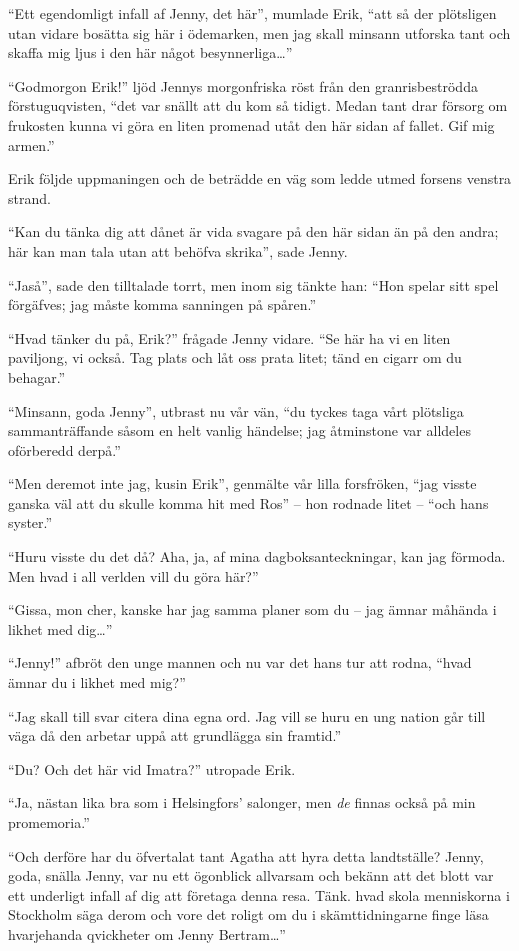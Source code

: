 ``Ett egendomligt infall af Jenny, det här'', mumlade Erik, ``att så der
plötsligen utan vidare bosätta sig här i ödemarken, men jag skall
minsann utforska tant och skaffa mig ljus i den här något
besynnerliga\ldots{}''

``Godmorgon Erik!'' ljöd Jennys morgonfriska röst från den
granrisbeströdda förstuguqvisten, ``det var snällt att du kom så tidigt.
Medan tant drar försorg om frukosten kunna vi göra en liten promenad
utåt den här sidan af fallet. Gif mig armen.''

Erik följde uppmaningen och de beträdde en väg som ledde utmed forsens
venstra strand.

``Kan du tänka dig att dånet är vida svagare på den här sidan än på den
andra; här kan man tala utan att behöfva skrika'', sade Jenny.

``Jaså'', sade den tilltalade torrt, men inom sig tänkte han: ``Hon
spelar sitt spel förgäfves; jag måste komma sanningen på spåren.''

``Hvad tänker du på, Erik?'' frågade Jenny vidare. ``Se här ha vi en
liten paviljong, vi också. Tag plats och låt oss prata litet; tänd en
cigarr om du behagar.''

``Minsann, goda Jenny'', utbrast nu vår vän, ``du tyckes taga vårt
plötsliga sammanträffande såsom en helt vanlig händelse; jag åtminstone
var alldeles oförberedd derpå.''

``Men deremot inte jag, kusin Erik'', genmälte vår lilla forsfröken,
``jag visste ganska väl att du skulle komma hit med Ros'' -- hon rodnade
litet -- ``och hans syster.''

``Huru visste du det då? Aha, ja, af mina dagboksanteckningar, kan jag
förmoda. Men hvad i all verlden vill du göra här?''

``Gissa, mon cher, kanske har jag samma planer som du -- jag ämnar
måhända i likhet med dig\ldots{}''

``Jenny!'' afbröt den unge mannen och nu var det hans tur att rodna,
``hvad ämnar du i likhet med mig?''

``Jag skall till svar citera dina egna ord. Jag vill se huru en ung
nation går till väga då den arbetar uppå att grundlägga sin framtid.''

``Du? Och det här vid Imatra?'' utropade Erik.

``Ja, nästan lika bra som i Helsingfors' salonger, men \emph{de} finnas
också på min promemoria.''

``Och derföre har du öfvertalat tant Agatha att hyra detta landtställe?
Jenny, goda, snälla Jenny, var nu ett ögonblick allvarsam och bekänn att
det blott var ett underligt infall af dig att företaga denna resa. Tänk.
hvad skola menniskorna i Stockholm säga derom och vore det roligt om du
i skämttidningarne finge läsa hvarjehanda qvickheter om Jenny
Bertram\ldots{}''

